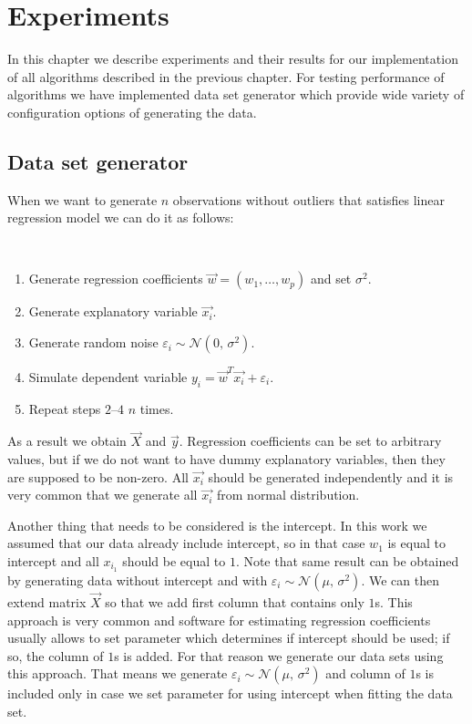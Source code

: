\chapter{Experiments} \label{chapterexperiments}
In this chapter we describe experiments and their results for our implementation of all algorithms described in the previous chapter.
For testing performance of algorithms we have implemented data set generator which provide wide variety of configuration options of generating the data.

\section{Data set generator}
When we want to generate $n$ observations without outliers that satisfies linear regression model we can do it as follows:

\begin{algo} \label{generate:linear:model}
    \mbox{}\vspace{\dimexpr-\baselineskip-\topsep}
\\
    \begin{enumerate}
        \item Generate regression coefficients $\vec{w} = (w_1, \ldots, w_p)$ and set $\sigma^{2}$.
        \item Generate explanatory variable $\vec{x_i}$.
        \item Generate random noise $\varepsilon_i \sim \mathcal{N}(0,\,\sigma^{2})$.
        \item Simulate dependent variable $y_i = \vec{w}^T\vec{x_i} + \varepsilon_i$.
        \item Repeat steps $2$--$4$ $n$ times.
    \end{enumerate}
\end{algo}
As a result we obtain $\vec{X}$ and $\vec{y}$. Regression coefficients can be set to arbitrary values, but if we do not want to have dummy explanatory variables, then they are supposed to be non-zero. All $\vec{x_i}$ should be generated independently and it is very common that we generate all $\vec{x_i}$ from normal distribution. 

Another thing that needs to be considered is the intercept. In this work we assumed that our data already include intercept, so in that case $w_1$ is equal to intercept and all $x_{i_1}$ should be equal to $1$. Note that same result can be obtained by generating data without intercept and with $\varepsilon_i \sim \mathcal{N}(\mu,\,\sigma^{2})$. We can then extend matrix $\vec{X}$ so that we add first column that contains only $1$s. This approach is very common and software for estimating regression coefficients usually allows to set parameter which determines if intercept should be used; if so, the column of $1$s is added. For that reason we generate our data sets using this approach. That means we generate $\varepsilon_i \sim \mathcal{N}(\mu,\,\sigma^{2})$ and column of $1$s is included only in case we set parameter for using intercept when fitting the data set. 

